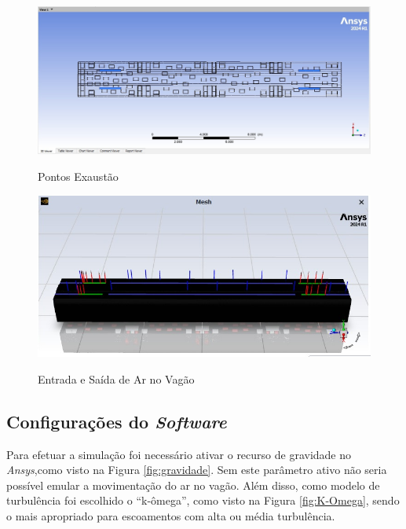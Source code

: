 \documentclass[acronym,symbols,table]{fei}
\begin{document}
\begin{figure}[!htb]
    \centering
    \caption{Pontos Exaustão}
    \includegraphics[width=1\linewidth]{Imagens/exaustao.jpeg}
    \label{fig:Pontos_Exaustao}
\end{figure}

\begin{figure}[!htb]
    \centering
    \caption{Entrada e Saída de Ar no Vagão}
    \includegraphics[width=1\linewidth]{Imagens/insuflamento_exaustao.jpeg}
    \label{fig:Pontos_Entrada_e_Saida}
\end{figure}

\subsection{Configurações do \textit{Software}}

Para efetuar a simulação foi necessário ativar o recurso de gravidade no \textit{Ansys},como visto na Figura \ref{fig:gravidade}. Sem este parâmetro ativo não seria possível emular a movimentação do ar no vagão. Além disso, como modelo de turbulência foi escolhido o “k-ômega”, como visto na Figura \ref{fig:K-Omega}, sendo o mais apropriado para escoamentos com alta ou média turbulência.
\end{document}
